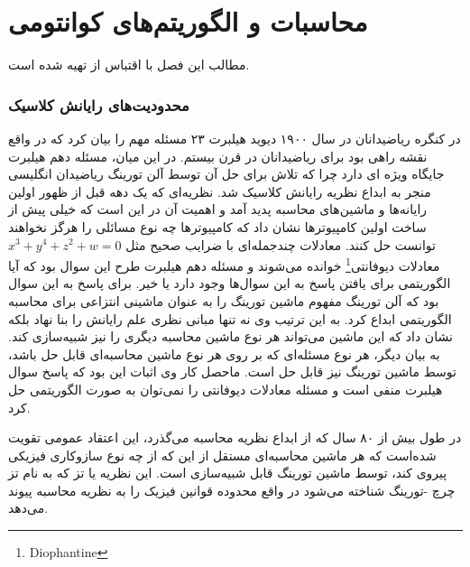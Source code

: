 \chapter{محاسبات و الگوریتم‌های کوانتومی}
 مطالب این فصل با اقتباس از 
 \cite{ 
 		nielsen10,
 		wolf19,
 		qis
 		}
 تهیه شده است.
  
\subsection{محدودیت‌های رایانش کلاسیک}
در کنگره ریاضیدانان در سال ١٩٠٠ دیوید هیلبرت ٢٣ مسئله مهم را بیان کرد که در واقع نقشه راهی بود برای ریاضیدانان در قرن بیستم.
 در این
میان، مسئله دهم هیلبرت جایگاه ویژه ای دارد چرا که تلاش برای حل آن توسط آلن تورینگ ریاضیدان انگلیسی منجر به ابداع نظریه رایانش
کلاسیک شد.
 نظریه‌ای که یک دهه قبل از ظهور اولین رایانه‌ها و ماشین‌های محاسبه پدید آمد و اهمیت آن در این است که خیلی پیش از ساخت
اولین کامپیوترها نشان داد که کامپیوترها چه نوع مسائلی را هرگز نخواهند توانست حل کنند.
 معادلات چندجمله‌ای با ضرایب صحیح مثل $x^{3} + y^{4} + z^{2} + w = 0$
 معادلات دیوفانتی\footnote{Diophantine} خوانده می‌شوند و مسئله دهم هیلبرت  طرح این سوال بود که آیا  الگوریتمی برای یافتن پاسخ به این سوال‌ها وجود دارد یا خیر.
برای پاسخ به این سوال بود که آلن تورینگ مفهوم ماشین تورینگ را به عنوان ماشینی انتزاعی برای محاسبه الگوریتمی ابداع کرد.
به این ترتیب وی نه تنها مبانی نظری علم رایانش را بنا نهاد بلکه نشان داد که این ماشین می‌تواند
هر نوع ماشین محاسبه دیگری را نیز شبیه‌سازی کند. به بیان دیگر، هر نوع مسئله‌ای که بر روی هر نوع ماشین محاسبه‌ای قابل حل باشد، توسط
ماشین تورینگ نیز قابل حل است. ماحصل کار وی اثبات این بود که پاسخ سوال هیلبرت منفی است و مسئله معادلات دیوفانتی را
نمی‌توان به صورت الگوریتمی حل کرد.

در طول بیش از ٨٠ سال که از ابداع نظریه محاسبه می‌گذرد، این اعتقاد عمومی تقویت شده‌است که هر ماشین محاسبه‌ای 
مستقل از این که از چه نوع سازوکاری فیزیکی پیروی کند، توسط ماشین تورینگ قابل شبیه‌سازی است. این نظریه یا تز که به نام تز چرچ -تورینگ شناخته می‌شود در واقع محدوده قوانین فیزیک را به نظریه محاسبه پیوند می‌دهد.


